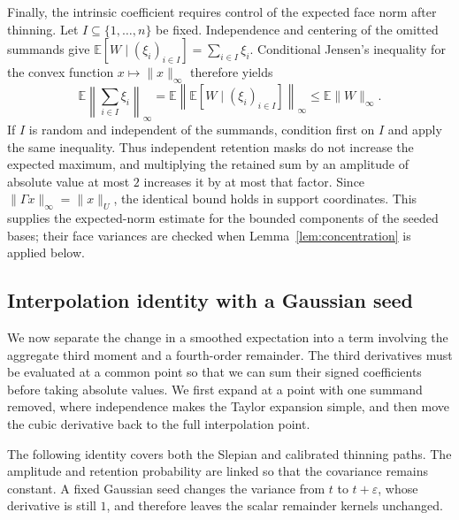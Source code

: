 \documentclass[11pt,letterpaper,twoside,leqno]{article}
\theoremstyle{bookplain}
\theoremstyle{bookremark}
\newcommand{\E}{\mathbb E}
\begin{document}
Finally, the intrinsic coefficient requires control of the expected
face norm after thinning. Let \(I\subseteq\{1,\ldots,n\}\) be fixed.
Independence and centering of the omitted summands give
\(\E[W\mid(\xi_i)_{i\in I}]=\sum_{i\in I}\xi_i\).
Conditional Jensen's inequality for the convex function
\(x\mapsto\|x\|_\infty\) therefore yields
\begin{equation}\label{appx-an:retained-maximum}
 \E\left\|\sum_{i\in I}\xi_i\right\|_\infty
 =\E\left\|\E[W\mid(\xi_i)_{i\in I}]\right\|_\infty
 \le\E\|W\|_\infty.
\end{equation}
If \(I\) is random and independent of the summands, condition first
on \(I\) and apply the same inequality. Thus independent retention
masks do not increase the expected maximum, and multiplying the
retained sum by an amplitude of absolute value at most \(2\)
increases it by at most that factor. Since
\(\|\Gamma x\|_\infty=\|x\|_U\), the identical bound holds in support
coordinates. This supplies the expected-norm estimate for the bounded
components of the seeded bases; their face variances are checked
when Lemma~\ref{lem:concentration} is applied below.

\subsection{Interpolation identity with a Gaussian seed}
\label{appx-an:sec:path}

We now separate the change in a smoothed expectation into a term
involving the aggregate third moment and a fourth-order remainder.
The third derivatives must be evaluated at a common point so that
we can sum their signed coefficients before taking absolute values.
We first expand at a point with one summand removed, where
independence makes the Taylor expansion simple, and then move the
cubic derivative back to the full interpolation point.

The following identity covers both the Slepian and calibrated
thinning paths. The amplitude and retention probability are linked
so that the covariance remains constant. A fixed Gaussian seed
changes the variance from \(t\) to \(t+\varepsilon\), whose derivative
is still \(1\), and therefore leaves the scalar remainder kernels
unchanged.
\end{document}
